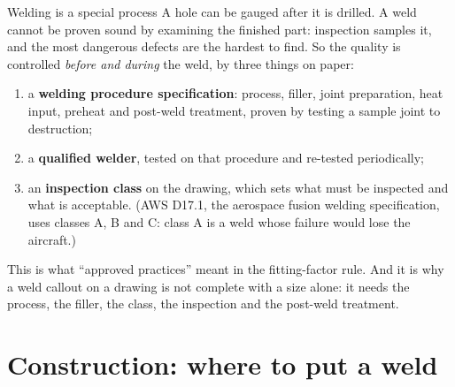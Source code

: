 \documentclass[11pt,a4paper]{article}
\begin{document}
\begin{keybox}{Welding is a special process}
A hole can be gauged after it is drilled. A weld cannot be proven sound by examining the finished
part: inspection samples it, and the most dangerous defects are the hardest to find. So the quality
is controlled \emph{before and during} the weld, by three things on paper:

\begin{enumerate}[leftmargin=*,nosep]
\item a \textbf{welding procedure specification}: process, filler, joint preparation, heat input,
  preheat and post-weld treatment, proven by testing a sample joint to destruction;
\item a \textbf{qualified welder}, tested on that procedure and re-tested periodically;
\item an \textbf{inspection class} on the drawing, which sets what must be inspected and what is
  acceptable. (AWS D17.1, the aerospace fusion welding specification, uses classes A, B and C:
  class A is a weld whose failure would lose the aircraft.)
\end{enumerate}

This is what ``approved practices'' meant in the fitting-factor rule. And it is why a weld callout
on a drawing is not complete with a size alone: it needs the process, the filler, the class, the
inspection and the post-weld treatment.
\end{keybox}

\section{Construction: where to put a weld}
\label{sec:construction}
\end{document}
